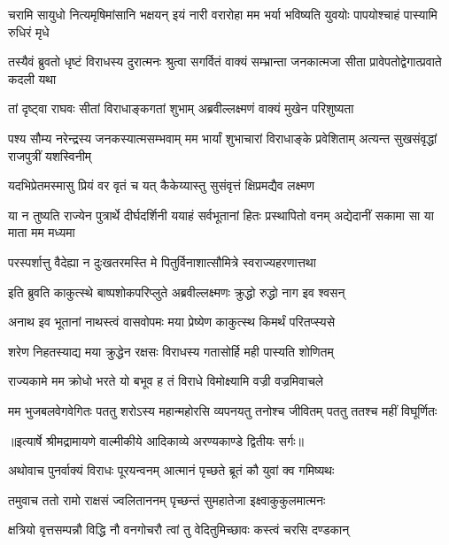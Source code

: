\threelineshloka
{चरामि सायुधो नित्यमृषिमांसानि भक्षयन्}
{इयं नारी वरारोहा मम भर्या भविष्यति}
{युवयोः पापयोश्चाहं पास्यामि रुधिरं मृधे} %

\threelineshloka
{तस्यैवं ब्रुवतो धृष्टं विराधस्य दुरात्मनः}
{श्रुत्वा सगर्वितं वाक्यं सम्भ्रान्ता जनकात्मजा}
{सीता प्रावेपतोद्वेगात्प्रवाते कदली यथा} %

\twolineshloka
{तां दृष्ट्वा राघवः सीतां विराधाङ्कगतां शुभाम्}
{अब्रवील्लक्ष्मणं वाक्यं मुखेन परिशुष्यता} %

\threelineshloka
{पश्य सौम्य नरेन्द्रस्य जनकस्यात्मसम्भवाम्}
{मम भार्यां शुभाचारां विराधाङ्के प्रवेशिताम्}
{अत्यन्त सुखसंवृद्धां राजपुत्रीं यशस्विनीम्} %

\twolineshloka
{यदभिप्रेतमस्मासु प्रियं वर वृतं च यत्}
{कैकेय्यास्तु सुसंवृत्तं क्षिप्रमद्यैव लक्ष्मण} %

\threelineshloka
{या न तुष्यति राज्येन पुत्रार्थे दीर्घदर्शिनी}
{ययाहं सर्वभूतानां हितः प्रस्थापितो वनम्}
{अद्येदानीं सकामा सा या माता मम मध्यमा} %

\twolineshloka
{परस्पर्शात्तु वैदेह्या न दुःखतरमस्ति मे}
{पितुर्विनाशात्सौमित्रे स्वराज्यहरणात्तथा} %

\twolineshloka
{इति ब्रुवति काकुत्स्थे बाष्पशोकपरिप्लुते}
{अब्रवील्लक्ष्मणः क्रुद्धो रुद्धो नाग इव श्वसन्} %

\twolineshloka
{अनाथ इव भूतानां नाथस्त्वं वासवोपमः}
{मया प्रेष्येण काकुत्स्थ किमर्थं परितप्स्यसे} %

\twolineshloka
{शरेण निहतस्याद्य मया क्रुद्धेन रक्षसः}
{विराधस्य गतासोर्हि मही पास्यति शोणितम्} %

\twolineshloka
{राज्यकामे मम क्रोधो भरते यो बभूव ह}
{तं विराधे विमोक्ष्यामि वज्री वज्रमिवाचले} %

\fourlineindentedshloka
{मम भुजबलवेगवेगितः}
{पततु शरोऽस्य महान्महोरसि}
{व्यपनयतु तनोश्च जीवितम्}
{पततु ततश्च महीं विघूर्णितः} %


{॥इत्यार्षे श्रीमद्रामायणे वाल्मीकीये आदिकाव्ये अरण्यकाण्डे द्वितीयः सर्गः॥}


\twolineshloka
{अथोवाच पुनर्वाक्यं विराधः पूरयन्वनम्}
{आत्मानं पृच्छते ब्रूतं कौ युवां क्व गमिष्यथः} %

\twolineshloka
{तमुवाच ततो रामो राक्षसं ज्वलिताननम्}
{पृच्छन्तं सुमहातेजा इक्ष्वाकुकुलमात्मनः} %

\twolineshloka
{क्षत्रियो वृत्तसम्पन्नौ विद्धि नौ वनगोचरौ}
{त्वां तु वेदितुमिच्छावः कस्त्वं चरसि दण्डकान्} %

